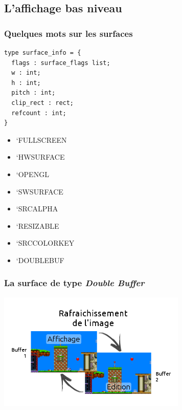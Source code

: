 \subsection{L'affichage bas niveau} %
\begin{frame}[fragile]
	\frametitle{Quelques mots sur les surfaces}
	\begin{minipage}{0.55\textwidth}
		\lstset{basicstyle=\small}
		\begin{lstlisting}
type surface_info = {
  flags : surface_flags list;
  w : int;
  h : int;
  pitch : int;
  clip_rect : rect;
  refcount : int;
}
		\end{lstlisting}
	\end{minipage}
	\begin{minipage}{0.4\textwidth}
		\begin{itemize}
			\item `FULLSCREEN
			\item `HWSURFACE
			\item `OPENGL
			\item `SWSURFACE
			\item `SRCALPHA
			\item `RESIZABLE
			\item `SRCCOLORKEY
			\item `DOUBLEBUF
		\end{itemize}
	\end{minipage}
\end{frame}


\begin{frame}
	\frametitle{La surface de type \textit{Double Buffer}}
	\begin{center}
		\includegraphics[width=9cm]{pics/doubleBuffer.png}
	\end{center}
\end{frame}


